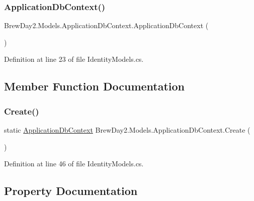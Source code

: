 \subsubsection{\texorpdfstring{Application\+Db\+Context()}{ApplicationDbContext()}}
{\footnotesize\ttfamily Brew\+Day2.\+Models.\+Application\+Db\+Context.\+Application\+Db\+Context (\begin{DoxyParamCaption}{ }\end{DoxyParamCaption})}



Definition at line 23 of file Identity\+Models.\+cs.



\subsection{Member Function Documentation}
\mbox{\label{class_brew_day2_1_1_models_1_1_application_db_context_a38a3a3e7dcf57f43e88f513440a9c687}} 
\subsubsection{\texorpdfstring{Create()}{Create()}}
{\footnotesize\ttfamily static \mbox{\hyperlink{class_brew_day2_1_1_models_1_1_application_db_context}{Application\+Db\+Context}} Brew\+Day2.\+Models.\+Application\+Db\+Context.\+Create (\begin{DoxyParamCaption}{ }\end{DoxyParamCaption})\hspace{0.3cm}{\ttfamily [static]}}



Definition at line 46 of file Identity\+Models.\+cs.



\subsection{Property Documentation}
\mbox{\label{class_brew_day2_1_1_models_1_1_application_db_context_a9da0337ce439d4e85e35127e607097b6}} 
